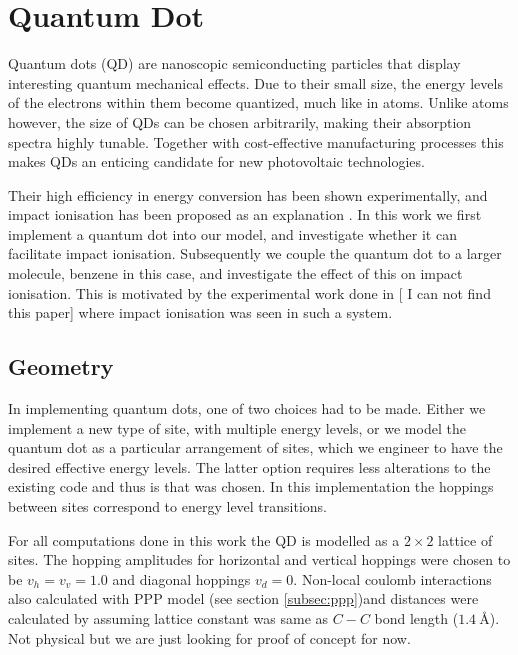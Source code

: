 \section{Quantum Dot}

Quantum dots (QD) are nanoscopic semiconducting particles that display interesting quantum mechanical effects. Due to their small size, the energy levels of the electrons within them become quantized, much like in atoms. Unlike atoms however, the size of QDs can be chosen arbitrarily, making their absorption spectra highly tunable.  Together with cost-effective manufacturing processes this makes QDs an enticing candidate for new photovoltaic technologies.
\medskip

Their high efficiency in energy conversion has been shown experimentally, and impact ionisation has been proposed as an explanation \cite{impact_io_in_qd}. In this work we first implement a quantum dot into our model, and investigate whether it can facilitate impact ionisation. Subsequently we couple the quantum dot to a larger molecule, benzene in this case, and investigate the effect of this on impact ionisation. This is motivated by the experimental work done in [{\color{red} I can not find this paper}] where impact ionisation was seen in such a system.

\subsection{Geometry}
 
 In implementing quantum dots, one of two choices had to be made. Either we implement a new type of site, with multiple energy levels, or we model the quantum dot as a particular arrangement of sites, which we engineer to have the desired effective energy levels. The latter option requires less alterations to the existing code and thus is that was chosen. In this implementation the hoppings between sites correspond to energy level transitions.
 
 \medskip
 
 For all computations done in this work the QD is modelled as a $2\times 2$ lattice of sites. The hopping amplitudes for horizontal and vertical hoppings were chosen to be $v_h = v_v = 1.0$ and diagonal hoppings $v_d = 0$. Non-local coulomb interactions also calculated with PPP model (see section \ref{subsec:ppp})and distances were calculated by assuming lattice constant was same as $C-C$ bond length ($\SI{1.4}{\angstrom}$). Not physical but we are just looking for proof of concept for now.
 
